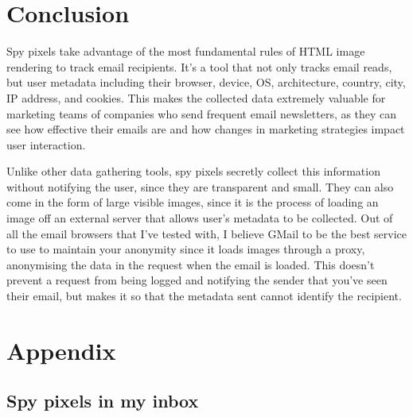 \documentclass{article}
\begin{document}
\section{Conclusion}

Spy pixels take advantage of the most fundamental rules of HTML image rendering to track email recipients. It's a tool that not only tracks email reads, but user metadata including their browser, device, OS, architecture, country, city, IP address, and cookies. This makes the collected data extremely valuable for marketing teams of companies who send frequent email newsletters, as they can see how effective their emails are and how changes in marketing strategies impact user interaction.

Unlike other data gathering tools, spy pixels secretly collect this information without notifying the user, since they are transparent and small. They can also come in the form of large visible images, since it is the process of loading an image off an external server that allows user's metadata to be collected. Out of all the email browsers that I've tested with, I believe GMail to be the best service to use to maintain your anonymity since it loads images through a proxy, anonymising the data in the request when the email is loaded. This doesn't prevent a request from being logged and notifying the sender that you've seen their email, but makes it so that the metadata sent cannot identify the recipient.

\newpage

\section{Appendix}

\subsection{\label{appendix-inbox}Spy pixels in my inbox}
\end{document}
